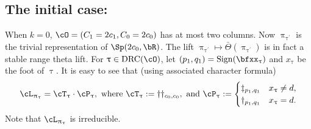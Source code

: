 \documentclass[12pt,a4paper]{amsart}
\def\eDD{\overline{\nabla}}
\numberwithin{equation}{section}
\newtheorem{claim}[thm]{Claim}
\theoremstyle{remark}
\def\ssign{\mathrm{Sign}}
\def\Thetab{\bar{\Theta}}
\def\drc{\mathrm{DRC}}
\let\ytb=\ytableaushort
\def\cOp{\cO^{\prime}}
\def\cOpp{\cO^{\prime\prime}}
\def\uptaup{\uptau^{\prime}}
\def\uptaupp{\uptau^{\prime\prime}}
\begin{document}



\subsection{The initial case:}\label{sec:pfDC.init}
When $k=0$, $\cO = (C_{1}=2c_{1},C_{0}=2c_{0})$ has  at most
two columns.
Now $\uppi_{\uptaup}$ is the trivial representation of $\Sp(2c_{0},\bR)$.
The lift $\uppi_{\uptaup} \mapsto \Thetab(\uppi_{\uptaup})$ is in fact a stable
range theta lift.%
For $\uptau\in \drc(\cO)$, let $(p_{1},q_{1}) = \ssign(\bfxx_{\uptau})$ and
$x_{\uptau}$ be the foot of $\uptau$. It is easy to see that  (using associated
character formula)
\[
  \cL_{\uppi_{\uptau}} = \cT_{\uptau}\cdot \cP_{\uptau},
  \text{ where }\cT_{\uptau}:=\dagger \dagger_{c_{0},c_{0}},
  \text{ and } \cP_{\uptau}:=\begin{cases}
    \ddagger_{p_{1},q_{1}}&  x_{\uptau} \neq d,\\
    \dagger_{p_{1},q_{1}}& x_{\uptau} = d.\\
  \end{cases}
\]
Note that $\cL_{\uppi_{\uptau}}$ is irreducible.
\end{document}
